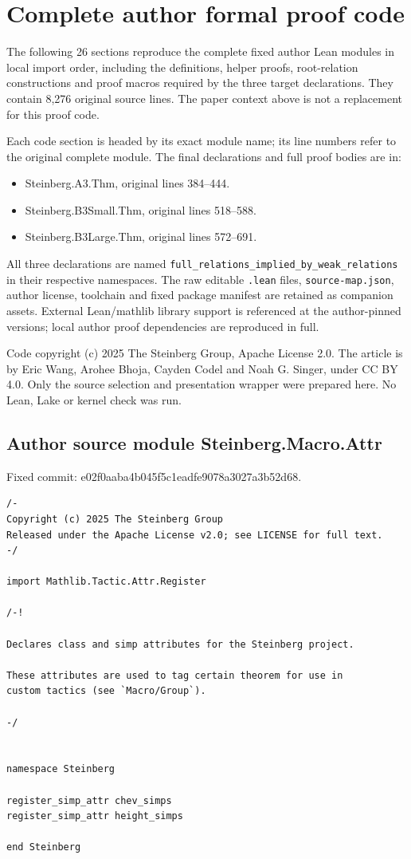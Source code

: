 \documentclass[10pt,a4paper]{article}
\begin{document}
\section*{Complete author formal proof code}
\noindent The following 26 sections reproduce the complete fixed author Lean modules in local import order, including the definitions, helper proofs, root-relation constructions and proof macros required by the three target declarations. They contain 8,276 original source lines. The paper context above is not a replacement for this proof code.
\par\medskip
\noindent Each code section is headed by its exact module name; its line numbers refer to the original complete module. The final declarations and full proof bodies are in:
\begin{itemize}
\item Steinberg.A3.Thm, original lines 384--444.
\item Steinberg.B3Small.Thm, original lines 518--588.
\item Steinberg.B3Large.Thm, original lines 572--691.
\end{itemize}
\noindent All three declarations are named \texttt{full\_relations\_implied\_by\_weak\_relations} in their respective namespaces. The raw editable \texttt{.lean} files, \texttt{source-map.json}, author license, toolchain and fixed package manifest are retained as companion assets. External Lean/mathlib library support is referenced at the author-pinned versions; local author proof dependencies are reproduced in full.
\par\medskip
\noindent Code copyright (c) 2025 The Steinberg Group, Apache License 2.0. The article is by Eric Wang, Arohee Bhoja, Cayden Codel and Noah G. Singer, under CC BY 4.0. Only the source selection and presentation wrapper were prepared here. No Lean, Lake or kernel check was run.

\subsection*{Author source module Steinberg.Macro.Attr}
\noindent Fixed commit: e02f0aaba4b045f5c1eadfe9078a3027a3b52d68.
\begin{Verbatim}
/-
Copyright (c) 2025 The Steinberg Group
Released under the Apache License v2.0; see LICENSE for full text.
-/

import Mathlib.Tactic.Attr.Register

/-!

Declares class and simp attributes for the Steinberg project.

These attributes are used to tag certain theorem for use in
custom tactics (see `Macro/Group`).

-/


namespace Steinberg

register_simp_attr chev_simps
register_simp_attr height_simps

end Steinberg
\end{Verbatim}
\end{document}
